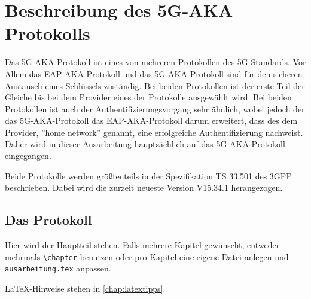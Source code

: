 \chapter{Beschreibung des 5G-AKA Protokolls}
\label{chap:2}

Das 5G-AKA-Protokoll ist eines von mehreren Protokollen des 5G-Standards.
Vor Allem das EAP-AKA-Protokoll und das 5G-AKA-Protokoll sind f\"ur den sicheren Austausch eines Schl\"ussels zust\"andig. 
Bei beiden Protokollen ist der erste Teil der Gleiche bis bei dem Provider eines der Protokolle ausgew\"ahlt wird. %
Bei beiden Protokollen ist auch der Authentifizierungsvorgang sehr \"ahnlich, wobei jedoch der das 5G-AKA-Protokoll das EAP-AKA-Protokoll darum erweitert, dass des dem Provider, ''home network'' genannt, eine erfolgreiche Authentifizierung nachweist. %
Daher wird in dieser Ausarbeitung haupts\"achlich auf das 5G-AKA-Protokoll eingegangen.

Beide Protokolle werden gr\"o{\ss}tenteils in der Spezifikation TS 33.501 des 3GPP beschrieben.
Dabei wird die zurzeit neueste Version V15.34.1 herangezogen.

\section{Das Protokoll}

Hier wird der Hauptteil stehen.
Falls mehrere Kapitel gewünscht, entweder mehrmals \texttt{\textbackslash{}chapter} benutzen oder pro Kapitel eine eigene Datei anlegen und \texttt{ausarbeitung.tex} anpassen.

LaTeX-Hinweise stehen in \cref{chap:latextipps}.
